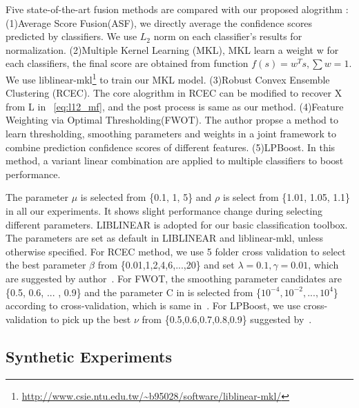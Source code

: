 \documentclass[letterpaper]{article}
\begin{document}


Five state-of-the-art fusion methods are compared with our proposed alogrithm : 
(1)Average Score Fusion(ASF), we directly average the confidence scores predicted by classifiers. We use $L_2$ norm on each classifier's results for normalization. 
(2)Multiple Kernel Learning (MKL),  MKL learn a weight w for each classifiers, the final score are obtained from function $f(s)=w^{T}s, \sum w = 1$. We use liblinear-mkl\footnote{\url{http://www.csie.ntu.edu.tw/~b95028/software/liblinear-mkl/}} to train our MKL model. 
(3)Robust Convex Ensemble Clustering (RCEC)\cite{gaoijcai2016robust}. The core alogrithm in RCEC can be modified to recover X from L in ~\ref{eq:l12_mf}, and the post process is same as our method. 
(4)Feature Weighting via Optimal Thresholding(FWOT)\cite{xuiccv2013feature}. The author propse a method to learn thresholding, smoothing parameters and weights in a joint framework to combine prediction confidence scores of different features. 
(5)LPBoost\cite{gehler2009feature}. In this method, a variant linear combination are applied to multiple classifiers to boost performance.


The parameter $\mu$ is selected from \{0.1, 1, 5\} and $\rho$ is select from \{1.01, 1.05, 1.1\} in all our experiments.
It shows slight performance change during selecting different parameters.
LIBLINEAR\cite{fan2008liblinear} is adopted for our basic classification toolbox.
The parameters are set as default in LIBLINEAR and liblinear-mkl, unless otherwise specified. 
For RCEC method, we use 5 folder cross validation to select the best parameter $\beta$ from \{0.01,1,2,4,6,...,20\} and set $\lambda = 0.1, \gamma = 0.01$, which are suggested by author~\cite{yiicdm2012robust}.
For FWOT, the smoothing parameter candidates are \{0.5, 0.6, ... , 0.9\} and the parameter C in is selected from \{$10^{-4},10^{-2},...,10^{4}$\} according to cross-validation, which is same in~\cite{xuiccv2013feature}. 
For LPBoost, we use cross-validation to pick up the best $\nu$ from \{0.5,0.6,0.7,0.8,0.9\} suggested by~\cite{xuiccv2013feature}.



\subsection{Synthetic Experiments}
\end{document}
